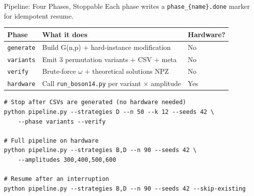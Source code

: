 \documentclass[aspectratio=169]{beamer}
\begin{document}
\begin{frame}[fragile]{Pipeline: Four Phases, Stoppable}
    Each phase writes a \texttt{phase\_\{name\}.done} marker for idempotent resume.

    \begin{table}
    \footnotesize
    \begin{tabular}{l l l}
        \toprule
        \textbf{Phase} & \textbf{What it does} & \textbf{Hardware?} \\
        \midrule
        \texttt{generate} & Build G(n,p) + hard-instance modification & No \\
        \texttt{variants} & Emit 3 permutation variants + CSV + meta  & No \\
        \texttt{verify}   & Brute-force $\omega$ + theoretical solutions NPZ & No \\
        \texttt{hardware} & Call \texttt{run\_boson14.py} per variant $\times$ amplitude & \alert{Yes} \\
        \bottomrule
    \end{tabular}
    \end{table}

    \vspace{0.5em}
\begin{lstlisting}[style=shell,numbers=none]
# Stop after CSVs are generated (no hardware needed)
python pipeline.py --strategies D --n 50 --k 12 --seeds 42 \
    --phase variants --verify

# Full pipeline on hardware
python pipeline.py --strategies B,D --n 90 --seeds 42 \
    --amplitudes 300,400,500,600

# Resume after an interruption
python pipeline.py --strategies B,D --n 90 --seeds 42 --skip-existing
\end{lstlisting}
\end{frame}

\end{document}

